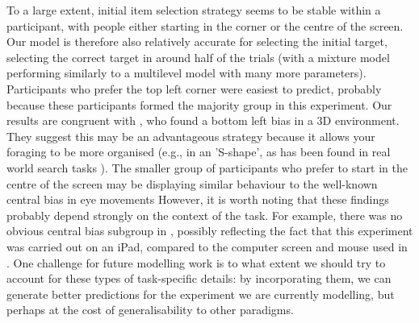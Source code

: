 \documentclass[vision,article,accept,pdftex,moreauthors]{Definitions/mdpi}
\begin{document}
To a large extent, initial item selection strategy seems to be stable within a participant, with people either starting in the corner or the centre of the screen. Our model is therefore also relatively accurate for selecting the initial target, selecting the correct target in around half of the trials (with a mixture model performing similarly to a multilevel model with many more parameters). Participants who prefer the top left corner were easiest to predict, probably because these participants formed the majority group in this experiment. Our results are congruent with \citep{kristjansson2022moving}, who found a bottom left bias in a 3D environment. They suggest this may be an advantageous strategy because it allows your foraging to be more organised (e.g., in an 'S-shape', as has been found in real world search tasks \citep{riggs2017importance}). The smaller group of participants who prefer to start in the centre of the screen may be displaying similar behaviour to the well-known central bias in eye movements \citep{tatler2007central, tseng2009quantifying, clarke2014deriving} However, it is worth noting that these findings probably depend strongly on the context of the task. For example, there was no obvious central bias subgroup in \citep{kristjansson2014}, possibly reflecting the fact that this experiment was carried out on an iPad, compared to the computer screen and mouse used in \citep{clarke2022}. One challenge for future modelling work is to what extent we should try to account for these types of task-specific details: by incorporating them, we can generate better predictions for the experiment we are currently modelling, but perhaps at the cost of generalisability to other paradigms.
\end{document}
